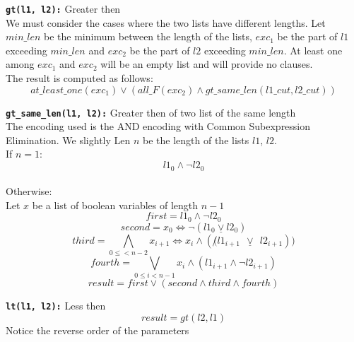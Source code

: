 \texttt{\textbf{gt(l1, l2):}} Greater then\\
We must consider the cases where the two lists have different lengths.
Let $min\_len$ be the minimum between the length of the lists, $exc_1$ be the part of $l1$ 
exceeding $min\_len$ and $exc_2$ 
be the part of $l2$ exceeding $min\_len$. At least one among $exc_1$ and $exc_2$ will be an
empty list and will provide no clauses.\\
The result is computed as follows:
\begin{equation}
    at\_least\_one(exc_1) \vee ( all\_F(exc_2) \wedge gt\_same\_len(l1\_cut, l2\_cut))
\end{equation}

\texttt{\textbf{gt\_same\_len(l1, l2):}} Greater then of two list of the same length\\
The encoding used is the AND encoding with Common Subexpression Elimination. We slightly
Len $n$ be the length of the lists $l1$, $l2$.\\
If $n=1$:
\begin{equation*}
    l1_0 \wedge \neg l2_0
\end{equation*}\\

Otherwise:\\
Let $x$ be a list of boolean variables of length $n-1$
\begin{equation*}
    first =  l1_0 \wedge \neg l2_0 %
\end{equation*}
%
\begin{equation*}
    second = x_0 \Longleftrightarrow \neg (l1_0 \underline\vee l2_0) %
\end{equation*}
%
\begin{equation*}
    third = \bigwedge\limits_{0 \leq <n-2} x_{i+1} \Longleftrightarrow x_i \wedge (\not (l1_{i+1} \ \ \underline\vee \ \ l2_{i+1}))%
\end{equation*}
%
\begin{equation*}
    fourth = \bigvee\limits_{0 \leq i < n-1} x_i \wedge (l1_{i+1} \wedge \neg l2_{i+1})
\end{equation*}
\begin{equation*}
    result = first \vee (second \wedge third \wedge fourth)
\end{equation*}

\texttt{\textbf{lt(l1, l2):}} Less then\\
\begin{equation}
    result = gt(l2, l1)
\end{equation}
Notice the reverse order of the parameters\\

